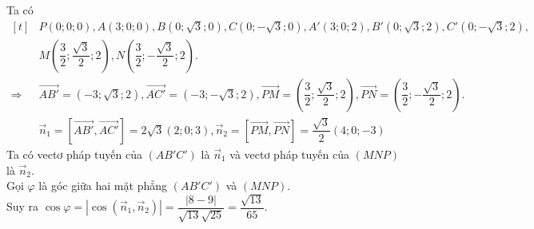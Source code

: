 \begin{ex}
{\begin{center}
		\end{center}
		Ta có
		$\begin{aligned}[t]
			& P(0;0;0), A(3;0;0), B(0;\sqrt{3};0), C(0;-\sqrt{3};0), A'(3;0;2), B'(0;\sqrt{3};2), C'(0;-\sqrt{3};2),\\
			& M\left(\dfrac{3}{2};\dfrac{\sqrt{3}}{2};2\right), N\left(\dfrac{3}{2};-\dfrac{\sqrt{3}}{2};2\right).\\
			\Rightarrow\ & \overrightarrow{AB'}=(-3;\sqrt{3};2), \overrightarrow{AC'}=(-3;-\sqrt{3};2), \overrightarrow{PM}=\left(\dfrac{3}{2};\dfrac{\sqrt{3}}{2};2\right), \overrightarrow{PN}=\left(\dfrac{3}{2};-\dfrac{\sqrt{3}}{2};2\right).\\
			& \overrightarrow{n}_1 =\left[\overrightarrow{AB'},\overrightarrow{AC'}\right] =2\sqrt{3}(2;0;3), \overrightarrow{n}_2=\left[\overrightarrow{PM},\overrightarrow{PN}\right]=\dfrac{\sqrt{3}}{2}(4;0;-3)
		\end{aligned}$\\
		Ta có vectơ pháp tuyến của $(AB'C')$ là $\overrightarrow{n}_1$ và vectơ pháp tuyến của $(MNP)$ là $\overrightarrow{n}_2$.\\
		Gọi $\varphi$ là góc giữa hai mặt phẳng $(AB'C')$ và $(MNP)$.\\
		Suy ra $\cos\varphi=\left|\cos\left(\overrightarrow{n}_1,\overrightarrow{n}_2\right)\right| =\dfrac{\left|8-9\right|}{\sqrt{13}\sqrt{25}}=\dfrac{\sqrt{13}}{65}$.
	}
\end{ex}

